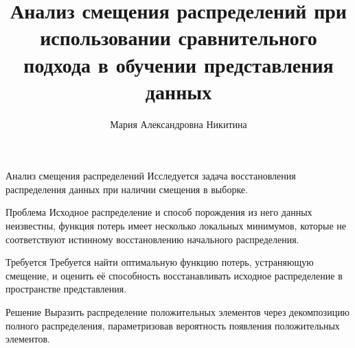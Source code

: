 \documentclass{beamer}
\title[\hbox to 56mm{Анализ смещения распределений}]{ Анализ смещения распределений при использовании сравнительного подхода в обучении представления данных}
\author[М.\,А. Никитина]{Мария Александровна Никитина}
\institute{Московский физико-технический институт}
\date{\footnotesize
\par\smallskip\emph{Кафедра:} Интеллектуальный анализ данных
\par\smallskip\emph{Научный руководитель:} кандидат ф.-м. наук Р.\,В.~Исаченко
\par\bigskip\small 2024}
\begin{document}
\begin{frame}
\thispagestyle{empty}
\maketitle
\end{frame}
\begin{frame}{Анализ смещения распределений}
\footnotesize
Исследуется задача восстановления распределения данных при наличии смещения в выборке.
\begin{block}{Проблема}
Исходное распределение и способ порождения из него данных неизвестны, функция потерь имеет несколько локальных минимумов, которые не соответствуют истинному восстановлению начального распределения.
\end{block}
\begin{block}{Требуется}
Требуется найти оптимальную функцию потерь, устраняющую смещение, и оценить её способность восстанавливать исходное распределение в пространстве представления.
\end{block}
\begin{block}{Решение}
Выразить распределение положительных элементов через декомпозицию полного распределения, параметризовав вероятность появления положительных элементов.
\end{block}
\end{frame}
\end{document}
